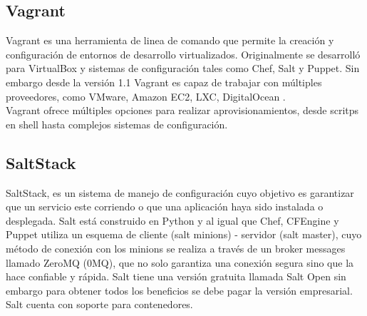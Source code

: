 \subsection{Vagrant}
Vagrant es una herramienta de linea de comando que permite la creación y configuración de entornos de desarrollo virtualizados. Originalmente se desarrolló para VirtualBox y sistemas de configuración tales como Chef, Salt y Puppet. Sin embargo desde la versión 1.1 Vagrant es capaz de trabajar con múltiples proveedores, como VMware, Amazon EC2, LXC, DigitalOcean \cite{Vag15}.
\\
Vagrant ofrece múltiples opciones para realizar aprovisionamientos, desde scritps en shell hasta complejos sistemas de configuración.

\subsection{SaltStack}
SaltStack, es un sistema de manejo de configuración cuyo objetivo es garantizar que un servicio este corriendo o que una aplicación haya sido instalada o desplegada. Salt está construido en Python y al igual que Chef, CFEngine y Puppet utiliza un esquema de cliente (salt minions) - servidor (salt master), cuyo método de conexión con los minions se realiza a través de un broker messages llamado ZeroMQ (0MQ), que no solo garantiza una conexión segura sino que la hace confiable y rápida. Salt tiene una versión gratuita llamada Salt Open sin embargo para obtener todos los beneficios se debe pagar la versión empresarial. Salt cuenta con soporte para contenedores. \cite{Salt15}
